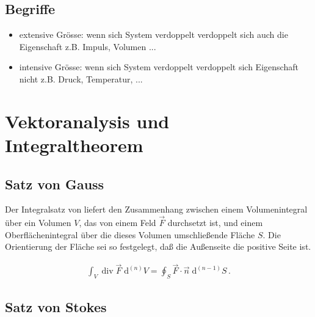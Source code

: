 \documentclass[a4paper]{scrartcl}
\begin{document}
\subsection{Begriffe}
\begin{itemize}
\item extensive Grösse: wenn sich System verdoppelt verdoppelt sich auch die Eigenschaft z.B. Impuls, Volumen ...
\item intensive Grösse: wenn sich System verdoppelt verdoppelt sich Eigenschaft nicht z.B. Druck, Temperatur, ...
\end{itemize}



\section{Vektoranalysis und Integraltheorem}
\subsection{Satz von Gauss}
Der Integralsatz von  liefert den Zusammenhang zwischen einem 
Volumenintegral über ein Volumen $V$, das von einem Feld $\vec F$ durchsetzt
ist, und einem Oberflächenintegral über die dieses Volumen umschließende
Fläche $S$. Die Orientierung der Fläche sei so festgelegt, daß die Außenseite
die positive Seite ist.

\begin{align}
\int_V \operatorname{div} \vec F \; \mathrm d^{(n)}V = \oint_{S} \vec F \cdot
\vec n\; \mathrm d^{(n-1)}S\,.
\end{align}
\subsection{Satz von Stokes}
\end{document}
